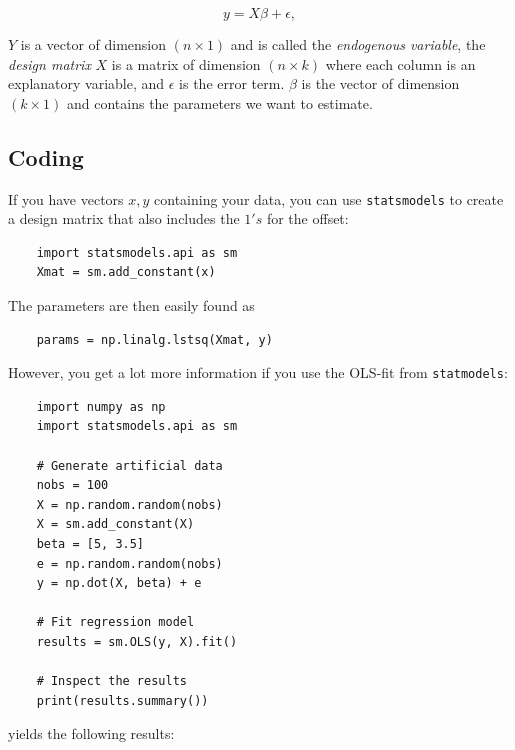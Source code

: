 \begin{equation}\label{eq:DesignMatrix}
    y=X\beta+ \epsilon,
\end{equation}

$Y$ is a vector of dimension $(n \times 1)$ and is called the \emph{endogenous variable}, the \emph{design matrix}  $X$ is a matrix of dimension $(n \times k)$ where each column is an explanatory variable, and $\epsilon$ is the error term. $\beta$ is the vector of dimension $(k \times 1)$ and contains the parameters we want to estimate.

\subsection{Coding}

If you have vectors $x,y$ containing your data, you can use \lstinline{statsmodels} to create a design matrix that also includes the $1's$ for the offset:

\begin{lstlisting}
    import statsmodels.api as sm
    Xmat = sm.add_constant(x)
\end{lstlisting}

The parameters are then easily found as

\begin{lstlisting}
    params = np.linalg.lstsq(Xmat, y)
\end{lstlisting}

However, you get a lot more information if you use the OLS-fit from \lstinline{statmodels}:

\begin{lstlisting}
    import numpy as np
    import statsmodels.api as sm

    # Generate artificial data
    nobs = 100
    X = np.random.random(nobs)
    X = sm.add_constant(X)
    beta = [5, 3.5]
    e = np.random.random(nobs)
    y = np.dot(X, beta) + e

    # Fit regression model
    results = sm.OLS(y, X).fit()

    # Inspect the results
    print(results.summary())
\end{lstlisting}

yields the following results:

